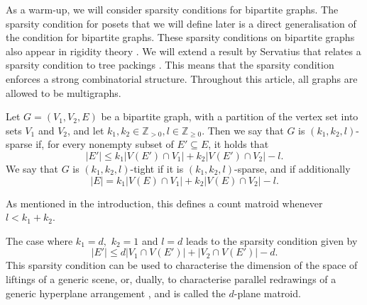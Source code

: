 \documentclass{article}
\begin{document}
As a warm-up, we will consider sparsity conditions for bipartite graphs. The sparsity condition for posets that we will define later is a direct generalisation of the condition for bipartite graphs. These sparsity conditions on bipartite graphs also appear in rigidity theory \cite{Plane_Matroid, discrete_matroids}. We will extend a result by Servatius that relates a sparsity condition to tree packings \cite{k-planematroids}. This means that the sparsity condition enforces a strong combinatorial structure. Throughout this article, all graphs are allowed to be multigraphs. 

\begin{definition}\label{def: bipartite def}
    Let $G=(V_1, V_2, E)$ be a bipartite graph, with a partition of the vertex set into sets $V_1$ and $V_2$, and let $k_1, k_2 \in \mathbb{Z}_{>0}, l\in \mathbb{Z}_{\geq 0}$. Then we say that $G$ is $(k_1, k_2, l)$-sparse if, for every nonempty subset of $E' \subseteq E$, it holds that
\begin{equation*}
     \vert E'\vert \leq k_1 \vert V(E') \cap V_1 \vert +  k_2 \vert V(E')\cap V_2 \vert - l.
\end{equation*}
    We say that $G$ is $(k_1, k_2, l)$-tight if it is $(k_1, k_2, l)$-sparse, and if additionally
\begin{equation*}
     \vert E\vert = k_1 \vert V(E) \cap V_1 \vert +  k_2 \vert V(E)\cap V_2 \vert - l.
\end{equation*}
\end{definition}

As mentioned in the introduction, this defines a count matroid whenever $l < k_1 +k_2$. 

\begin{example}
    The case where $k_1 = d,$ $k_2 = 1$ and $l=d$ leads to the sparsity condition given by
    \begin{equation*}
        |E'| \leq d |V_1 \cap V(E')| + |V_2 \cap V(E')| - d.
    \end{equation*}
    This sparsity condition can be used to characterise the dimension of the space of liftings of a generic scene, or, dually, to characterise parallel redrawings of a generic hyperplane arrangement \cite{discrete_matroids}, and is called the $d$-plane matroid.
\end{example}
\end{document}

